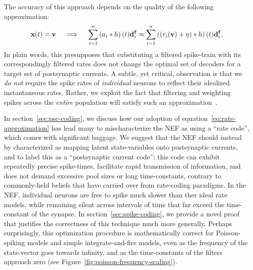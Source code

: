 
The accuracy of this approach depends on the quality of the following approximation:
\begin{equation} \label{eq:rate-approximation}
\mathbf{x}(t) = \mathbf{v} \quad \implies \quad \sum_{i=1}^n \left(a_i \ast h \right)(t) \mathbf{d}^{\mathbf{f}}_i \approx \sum_{i=1}^n \left( \left(r_i(\mathbf{v}) + \eta \right) \ast h \right)(t) \mathbf{d}^{\mathbf{f}}_i \text{.}
\end{equation}
In plain words, this presupposes that substituting a filtered spike-train with its correspondingly filtered rates does not change the optimal set of decoders for a target set of postsynaptic currents.
A subtle, yet critical, observation is that we \emph{do not} require the spike rates of \emph{individual} neurons to reflect their idealized instantaneous rates.
Rather, we exploit the fact that filtering and weighting spikes across the \emph{entire} population will satisfy such an approximation~\citep[][pp.~132--136]{eliasmith2003a}.

In section~\ref{sec:psc-coding}, we discuss how our adoption of equation~\ref{eq:rate-approximation} has lead many to mischaracterize the NEF as using a ``rate code'', which comes with significant baggage.
We suggest that the NEF should instead by characterized as mapping latent state-variables onto postsynaptic currents, and to label this as a ``postsynaptic current code''; this code can exhibit repeatedly precise spike-times, facilitate rapid transmission of information, and does not demand excessive pool sizes or long time-constants, contrary to commonly-held beliefs that have carried over from rate-coding paradigms.
In the NEF, individual neurons are free to spike much slower than ther ideal rate models, while remaining silent across intervals of time that far exceed the time-constant of the synapse.
In section~\ref{sec:spike-coding}, we provide a novel proof that justifies the correctness of this technique much more generally.
Perhaps surprisingly, this optimization procedure is mathematically correct for Poisson-spiking models and simple integrate-and-fire models, even as the frequency of the state-vector goes towards infinity, and as the time-constants of the filters approach zero (see Figure~\ref{fig:poisson-frequency-scaling}).

